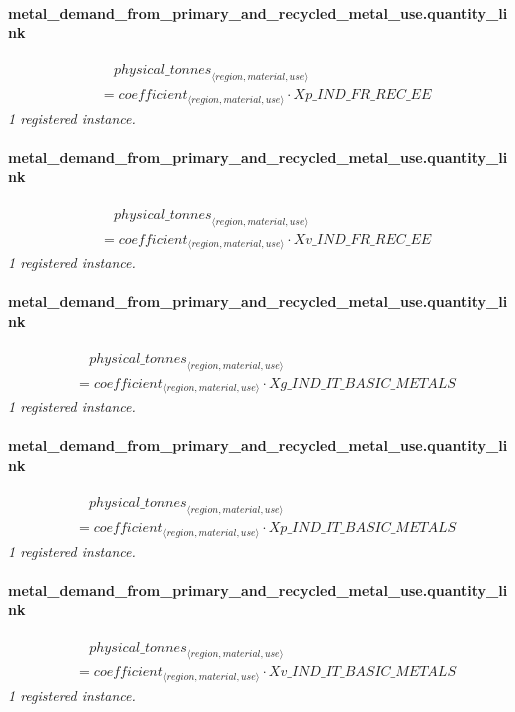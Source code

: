 \documentclass[11pt]{article}
\begin{document}
\paragraph{metal\_demand\_from\_primary\_and\_recycled\_metal\_use.quantity\_link}
\begin{align*}
&\quad {physical\_tonnes}_{\langle region, material, use\rangle}\\
&= coefficient_{\langle region, material, use\rangle} \cdot Xp\_IND\_FR\_REC\_EE
\end{align*}
\noindent\emph{1 registered instance.}\par
\paragraph{metal\_demand\_from\_primary\_and\_recycled\_metal\_use.quantity\_link}
\begin{align*}
&\quad {physical\_tonnes}_{\langle region, material, use\rangle}\\
&= coefficient_{\langle region, material, use\rangle} \cdot Xv\_IND\_FR\_REC\_EE
\end{align*}
\noindent\emph{1 registered instance.}\par
\paragraph{metal\_demand\_from\_primary\_and\_recycled\_metal\_use.quantity\_link}
\begin{align*}
&\quad {physical\_tonnes}_{\langle region, material, use\rangle}\\
&= coefficient_{\langle region, material, use\rangle} \cdot Xg\_IND\_IT\_BASIC\_METALS
\end{align*}
\noindent\emph{1 registered instance.}\par
\paragraph{metal\_demand\_from\_primary\_and\_recycled\_metal\_use.quantity\_link}
\begin{align*}
&\quad {physical\_tonnes}_{\langle region, material, use\rangle}\\
&= coefficient_{\langle region, material, use\rangle} \cdot Xp\_IND\_IT\_BASIC\_METALS
\end{align*}
\noindent\emph{1 registered instance.}\par
\paragraph{metal\_demand\_from\_primary\_and\_recycled\_metal\_use.quantity\_link}
\begin{align*}
&\quad {physical\_tonnes}_{\langle region, material, use\rangle}\\
&= coefficient_{\langle region, material, use\rangle} \cdot Xv\_IND\_IT\_BASIC\_METALS
\end{align*}
\noindent\emph{1 registered instance.}\par
\end{document}

